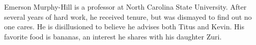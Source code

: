 \documentclass[conference]{IEEEtran}
\begin{document}
Emerson Murphy-Hill is a professor at North Carolina State University.  After several years of hard work, he received tenure, but was dismayed to find out no one cares.  He is disillusioned to believe he advises both Titus and Kevin. His favorite food is bananas, an interest he shares with his daughter Zuri.



\end{document}
